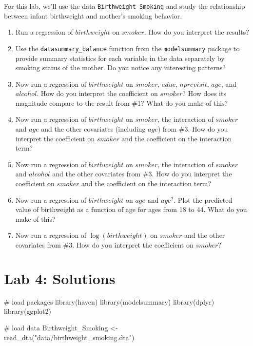 \documentclass[
  letterpaper,
  DIV=11,
  numbers=noendperiod]{scrreprt}
\newenvironment{Shaded}{\begin{snugshade}}{\end{snugshade}}
\newcommand{\CommentTok}[1]{\textcolor[rgb]{0.37,0.37,0.37}{#1}}
\newcommand{\FunctionTok}[1]{\textcolor[rgb]{0.28,0.35,0.67}{#1}}
\newcommand{\NormalTok}[1]{\textcolor[rgb]{0.00,0.23,0.31}{#1}}
\newcommand{\OtherTok}[1]{\textcolor[rgb]{0.00,0.23,0.31}{#1}}
\newcommand{\StringTok}[1]{\textcolor[rgb]{0.13,0.47,0.30}{#1}}
\begin{document}
For this lab, we'll use the data \texttt{Birthweight\_Smoking} and study
the relationship between infant birthweight and mother's smoking
behavior.

\begin{enumerate}
\def\labelenumi{\arabic{enumi}.}
\item
  Run a regression of \(birthweight\) on \(smoker\). How do you
  interpret the results?
\item
  Use the \texttt{datasummary\_balance} function from the
  \texttt{modelsummary} package to provide summary statistics for each
  variable in the data separately by smoking status of the mother. Do
  you notice any interesting patterns?
\item
  Now run a regression of \(birthweight\) on \(smoker\), \(educ\),
  \(nprevisit\), \(age\), and \(alcohol\). How do you interpret the
  coefficient on \(smoker\)? How does its magnitude compare to the
  result from \#1? What do you make of this?
\item
  Now run a regression of \(birthweight\) on \(smoker\), the interaction
  of \(smoker\) and \(age\) and the other covariates (including \(age\))
  from \#3. How do you interpret the coefficient on \(smoker\) and the
  coefficient on the interaction term?
\item
  Now run a regression of \(birthweight\) on \(smoker\), the interaction
  of \(smoker\) and \(alcohol\) and the other covariates from \#3. How
  do you interpret the coefficient on \(smoker\) and the coefficient on
  the interaction term?
\item
  Now run a regression of \(birthweight\) on \(age\) and \(age^2\). Plot
  the predicted value of birthweight as a function of age for ages from
  18 to 44. What do you make of this?
\item
  Now run a regression of \(\log(birthweight)\) on \(smoker\) and the
  other covariates from \#3. How do you interpret the coefficient on
  \(smoker\)?
\end{enumerate}

\section{Lab 4: Solutions}\label{lab-4-solutions}

\begin{Shaded}
\begin{Highlighting}[]
\CommentTok{\# load packages}
\FunctionTok{library}\NormalTok{(haven)}
\FunctionTok{library}\NormalTok{(modelsummary)}
\FunctionTok{library}\NormalTok{(dplyr)}
\FunctionTok{library}\NormalTok{(ggplot2)}

\CommentTok{\# load data}
\NormalTok{Birthweight\_Smoking }\OtherTok{\textless{}{-}} \FunctionTok{read\_dta}\NormalTok{(}\StringTok{"data/birthweight\_smoking.dta"}\NormalTok{)}
\end{Highlighting}
\end{Shaded}
\end{document}
